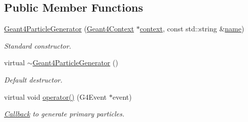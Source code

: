 \subsection*{Public Member Functions}
\begin{DoxyCompactItemize}
\item 
\hyperlink{class_d_d4hep_1_1_simulation_1_1_geant4_particle_generator_a5a3f47d84f92db9d572be0fa5f0e3779}{Geant4\+Particle\+Generator} (\hyperlink{class_d_d4hep_1_1_simulation_1_1_geant4_context}{Geant4\+Context} $\ast$\hyperlink{class_d_d4hep_1_1_simulation_1_1_geant4_action_aa9d87f0ec2a72b7fc2591b18f98d75cf}{context}, const std\+::string \&\hyperlink{class_d_d4hep_1_1_simulation_1_1_geant4_action_af374e70b014d16afb81dd9d77cc3894b}{name})
\begin{DoxyCompactList}\small\item\em Standard constructor. \end{DoxyCompactList}\item 
virtual \hyperlink{class_d_d4hep_1_1_simulation_1_1_geant4_particle_generator_a4fdb46f784ede918c2970e260e2fe218}{$\sim$\+Geant4\+Particle\+Generator} ()
\begin{DoxyCompactList}\small\item\em Default destructor. \end{DoxyCompactList}\item 
virtual void \hyperlink{class_d_d4hep_1_1_simulation_1_1_geant4_particle_generator_a4b7c8fdbc6fdc0c79efdf112c8ede315}{operator()} (G4\+Event $\ast$event)
\begin{DoxyCompactList}\small\item\em \hyperlink{class_d_d4hep_1_1_callback}{Callback} to generate primary particles. \end{DoxyCompactList}\end{DoxyCompactItemize}
